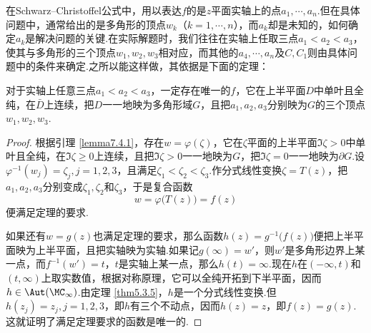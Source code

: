 在Schwarz--Christoffel公式中，用以表达$f$的是$z$平面实轴上的点$a_1,\cdots,a_n$.但在具体问题中，通常给出的是多角形的顶点$w_k$（$k=1,\cdots,n$），而$a_k$却是未知的，如何确定$a_k$是解决问题的关键.在实际解题时，我们往往在实轴上任取三点$a_1<a_2<a_3$，使其与多角形的三个顶点$w_1,w_2,w_3$相对应，而其他的$a_4,\cdots,a_n$及$C,C_1$则由具体问题中的条件来确定.之所以能这样做，其依据是下面的定理：

\begin{theorem}\label{thm7.4.4}
 对于实轴上任意三点$a_1<a_2<a_3$，一定存在唯一的$f$，它在上半平面$D$中单叶且全纯，在$\bar D$上连续，把$D$一一地映为多角形域$G$，且把$a_1,a_2,a_3$分别映为$G$的三个顶点$w_1,w_2,w_3$.
\end{theorem}
\begin{proof}
根据引理 \ref{lemma7.4.1}，存在$w=\varphi(\zeta)$，它在$\zeta$平面的上半平面$\Im\zeta>0$中单叶且全纯，在$\Im\zeta\ge0$上连续，且把$\Im\zeta>0$一一地映为$G$，把$\Im\zeta=0$一一地映为$\partial G$.设$\varphi^{-1}(w_j)=\zeta_j,j=1,2,3$，且满足$\zeta_1<\zeta_2<\zeta_3$.作分式线性变换$\zeta=T(z)$，把$a_1,a_2,a_3$分别变成$\zeta_1,\zeta_2$和$\zeta_3$，于是复合函数
\[w=\varphi\big(T(z)\big)=f(z)\]
便满足定理的要求.

如果还有$w=g(z)$也满足定理的要求，那么函数$h(z)=g^{-1}\big(f(z)\big)$便把上半平面映为上半平面，且把实轴映为实轴.如果记$g(\infty)=w'$，则$w'$是多角形边界上某一点，而$f^{-1}(w')=t$，$t$是实轴上某一点，那么$h(t)=\infty$.现在$h$在$(-\infty,t)$和$(t,\infty)$上取实数值，根据对称原理，它可以全纯开拓到下半平面，因而$h\in\Aut(\MC_\infty)$.由定理 \ref{thm5.3.5}，$h$是一个分式线性变换.但$h(z_j)=z_j,j=1,2,3$，即$h$有三个不动点，因而$h(z)=z$，即$f(z)=g(z)$.这就证明了满足定理要求的函数是唯一的.
\end{proof}

